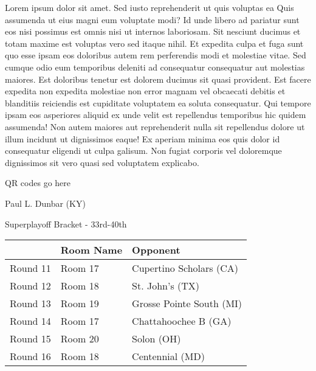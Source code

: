 \documentclass{article}%
\begin{document}
\vspace*{8pt}%
\linebreak%
\newline%
\newline%
    Lorem ipsum dolor sit amet. Sed iusto reprehenderit ut quis voluptas ea Quis assumenda ut eius magni eum voluptate modi? Id unde libero ad pariatur sunt eos nisi possimus est omnis nisi ut internos laboriosam. Sit nesciunt ducimus et totam maxime est voluptas vero sed itaque nihil. Et expedita culpa et fuga sunt quo esse ipsam eos doloribus autem rem perferendis modi et molestiae vitae.\newline%
\newline%
    Sed cumque odio eum temporibus deleniti ad consequatur consequatur aut molestias maiores. Est doloribus tenetur est dolorem ducimus sit quasi provident. Est facere expedita non expedita molestiae non error magnam vel obcaecati debitis et blanditiis reiciendis est cupiditate voluptatem ea soluta consequatur. Qui tempore ipsam eos asperiores aliquid ex unde velit est repellendus temporibus hic quidem assumenda!\newline%
\newline%
    Non autem maiores aut reprehenderit nulla sit repellendus dolore ut illum incidunt ut dignissimos eaque! Ex aperiam minima eos quis dolor id consequatur eligendi ut culpa galisum. Non fugiat corporis vel doloremque dignissimos sit vero quasi sed voluptatem explicabo.\newline%
\newline%
\vspace*{30pt}%
\begin{center}%
\begin{Huge}%
QR codes go here%
\end{Huge}%
\end{center}%
\newpage%
\begin{center}%
\begin{Huge}%
Paul L. Dunbar (KY)%
\end{Huge}%
\vspace*{8pt}%
\linebreak%
\begin{Large}%
Superplayoff Bracket {-} 33rd{-}40th%
\end{Large}%
\end{center}%
%
\begin{tabularx}{\textwidth}{|c|Y|Y|}%
\hline%
&Room Name&Opponent\\%
\hline%
Round 11&Room 17&Cupertino Scholars (CA)\\%
Round 12&Room 18&St. John's (TX)\\%
Round 13&Room 19&Grosse Pointe South (MI)\\%
Round 14&Room 17&Chattahoochee B (GA)\\%
Round 15&Room 20&Solon (OH)\\%
Round 16&Room 18&Centennial (MD)\\%
\hline%
\end{tabularx}%
\end{document}
